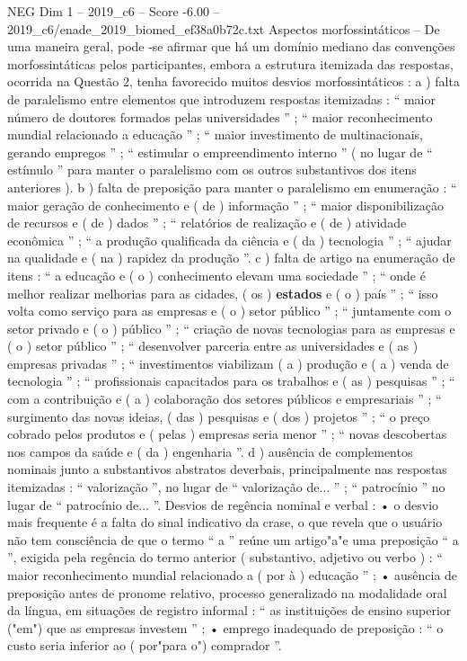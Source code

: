 \begin{textsample}{NEG Dim 1 – 2019\_c6 – Score -6.00 – 2019\_c6/enade\_2019\_biomed\_ef38a0b72c.txt}
Aspectos morfossintáticos – De uma maneira geral, pode -se afirmar que há um domínio mediano das convenções morfossintáticas pelos participantes, embora a estrutura itemizada das respostas, ocorrida na Questão 2, tenha favorecido muitos desvios morfossintáticos : a ) falta de paralelismo entre elementos que introduzem respostas itemizadas : “ maior número de doutores formados pelas universidades ” ; “ maior reconhecimento mundial relacionado a educação ” ; “ maior investimento de multinacionais, gerando empregos ” ; “ estimular o empreendimento interno ” ( no lugar de “ estímulo ” para manter o paralelismo com os outros substantivos dos itens anteriores ). b ) falta de preposição para manter o paralelismo em enumeração : “ maior geração de conhecimento e ( de ) informação ” ; “ maior disponibilização de recursos e ( de ) dados ” ; “ relatórios de realização e ( de ) atividade econômica ” ; “ a produção qualificada da ciência e ( da ) tecnologia ” ; “ ajudar na qualidade e ( na ) rapidez da produção ”. c ) falta de artigo na enumeração de itens : “ a educação e ( o ) conhecimento elevam uma sociedade ” ; “ onde é melhor realizar melhorias para as cidades, ( os ) \textbf{estados} e ( o ) país ” ; “ isso volta como serviço para as empresas e ( o ) setor público ” ; “ juntamente com o setor privado e ( o ) público ” ; “ criação de novas tecnologias para as empresas e ( o ) setor público ” ; “ desenvolver parceria entre as universidades e ( as ) empresas privadas ” ; “ investimentos viabilizam ( a ) produção e ( a ) venda de tecnologia ” ; “ profissionais capacitados para os trabalhos e ( as ) pesquisas ” ; “ com a contribuição e ( a ) colaboração dos setores públicos e empresariais ” ; “ surgimento das novas ideias, ( das ) pesquisas e ( dos ) projetos ” ; “ o preço cobrado pelos produtos e ( pelas ) empresas seria menor ” ; “ novas descobertas nos campos da saúde e ( da ) engenharia ”. d ) ausência de complementos nominais junto a substantivos abstratos deverbais, principalmente nas respostas itemizadas : “ valorização ”, no lugar de “ valorização de... ” ; “ patrocínio ” no lugar de “ patrocínio de... ”.
Desvios de regência nominal e verbal : • o desvio mais frequente é a falta do sinal indicativo da crase, o que revela que o usuário não tem consciência de que o termo “ a ” reúne um artigo"a"e uma preposição “ a ”, exigida pela regência do termo anterior ( substantivo, adjetivo ou verbo ) : “ maior reconhecimento mundial relacionado a ( por à ) educação ” ; • ausência de preposição antes de pronome relativo, processo generalizado na modalidade oral da língua, em situações de registro informal : “ as instituições de ensino superior ("em") que as empresas investem ” ; • emprego inadequado de preposição : “ o custo seria inferior ao ( por"para o") comprador ”.

\end{textsample}
